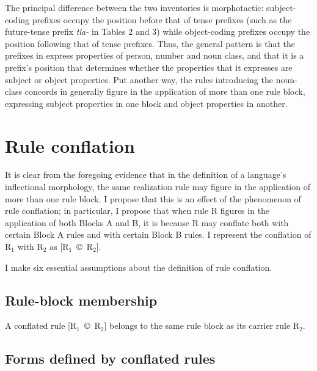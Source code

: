 \documentclass[output=paper,
modfonts
]{LSP/langsci}
\begin{document}
The principal difference between the two inventories is morphotactic:  subject-coding prefixes occupy the position before that of tense prefixes (such as the future-tense prefix \textit{tla\nobreakdash-} in Tables 2 and 3) while object-coding prefixes occupy the position following that of tense prefixes.  Thus, the general pattern is that the prefixes in  express properties of person, number and noun class, and that it is a prefix’s position that determines whether the properties that it expresses are subject or object properties.  Put another way, the rules introducing the noun-class concords in  generally figure in the application of more than one rule block, expressing subject properties in one block and object properties in another.

\section{Rule conflation}
It is clear from the foregoing evidence that in the definition of a language’s inflectional morphology, the same realization rule may figure in the application of more than one rule block.  I propose that this is an effect of the phenomenon of rule conflation; in particular, I propose that when rule R figures in the application of both Blocks A and B, it is because R may conflate both with certain Block A rules and with certain Block B rules.  I represent the conflation of R$_{1}$ with R$_{2}$ as [R$_{1}$~©~R$_{2}$].

I make six essential assumptions about the definition of rule conflation.  

 \subsection{Rule-block membership} 

A conflated rule [R$_{1}$~©~R$_{2}$] belongs to the same rule block as its carrier rule R$_{2}$.  

 \subsection{Forms defined by conflated rules}
\end{document}
